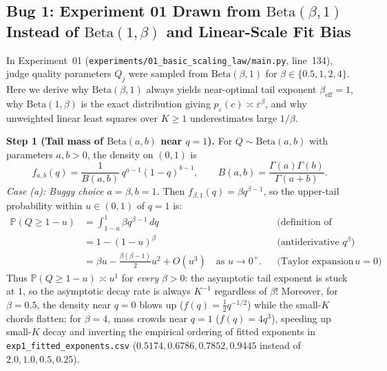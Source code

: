 \documentclass[11pt]{article}
\newcommand{\Prob}{\mathbb{P}}
\begin{document}
\subsection{\texorpdfstring{Bug 1: Experiment 01 Drawn from $\mathrm{Beta}(\beta, 1)$ Instead of $\mathrm{Beta}(1, \beta)$ and Linear-Scale Fit Bias}{Coverage sampling law and fit bias}}
\label{sec:beta_fix}

In Experiment~01 (\texttt{experiments/01\_basic\_scaling\_law/main.py}, line~134), judge quality parameters $Q_j$ were sampled from $\mathrm{Beta}(\beta, 1)$ for $\beta \in \{0.5, 1, 2, 4\}$. Here we derive why $\mathrm{Beta}(\beta, 1)$ always yields near-optimal tail exponent $\beta_{\mathrm{eff}} = 1$, why $\mathrm{Beta}(1, \beta)$ is the exact distribution giving $p_\varepsilon(c) \asymp \varepsilon^\beta$, and why unweighted linear least squares over $K \ge 1$ underestimates large $1/\beta$.

\textbf{Step 1 (Tail mass of $\mathrm{Beta}(a, b)$ near $q = 1$).}
For $Q \sim \mathrm{Beta}(a, b)$ with parameters $a, b > 0$, the density on $(0,1)$ is
\begin{equation}
f_{a,b}(q) = \frac{1}{B(a,b)}\, q^{a-1} (1 - q)^{b-1}, \qquad B(a,b) = \frac{\Gamma(a)\Gamma(b)}{\Gamma(a+b)}.
\end{equation}
\emph{Case (a): Buggy choice $a = \beta, b = 1$.} Then $f_{\beta,1}(q) = \beta q^{\beta-1}$, so the upper-tail probability within $u \in (0,1)$ of $q=1$ is:
\begin{align}
\Prob(Q \ge 1 - u)
&= \int_{1-u}^1 \beta q^{\beta-1}\,dq && \text{(definition of CDF)} \nonumber\\
&= 1 - (1 - u)^\beta && \text{(antiderivative $q^\beta$)} \nonumber\\
&= \beta u - \frac{\beta(\beta-1)}{2}u^2 + O(u^3) \quad \text{as } u \to 0^+. && \text{(Taylor expansion at $u=0$)}
\end{align}
Thus $\Prob(Q \ge 1 - u) \asymp u^1$ for \emph{every} $\beta > 0$: the asymptotic tail exponent is stuck at $1$, so the asymptotic decay rate is always $K^{-1}$ regardless of $\beta$! Moreover, for $\beta = 0.5$, the density near $q = 0$ blows up ($f(q) = \tfrac{1}{2}q^{-1/2}$) while the small-$K$ chords flatten; for $\beta = 4$, mass crowds near $q = 1$ ($f(q) = 4q^3$), speeding up small-$K$ decay and inverting the empirical ordering of fitted exponents in \texttt{exp1\_fitted\_exponents.csv} ($0.5174, 0.6786, 0.7852, 0.9445$ instead of $2.0, 1.0, 0.5, 0.25$).
\end{document}
